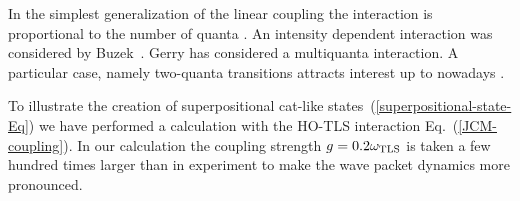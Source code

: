 \documentclass[12pt,twoside,a4paper]{report}
\begin{document}
In the simplest generalization of the linear coupling 
the interaction is proportional 
to the number of quanta \cite{puri92}.
An intensity dependent interaction
was considered by Buzek~\cite{buze89}.
Gerry \cite{gerr88} has considered a multiquanta interaction. 
A particular case, namely two-quanta
transitions attracts interest up to nowadays
\cite{gerr88,davi87,puri88,zhou91,ng99}.

To illustrate the creation of superpositional cat-like
states~(\ref{superpositional-state-Eq}) we have performed a calculation with 
the HO-TLS
interaction Eq.~(\ref{JCM-coupling}).  
In our
calculation the coupling strength $g=0.2\omega_{\rm TLS}$ is taken a few
hundred times larger than in experiment \cite{brun96} to make the wave packet dynamics more
pronounced.
\end{document}
